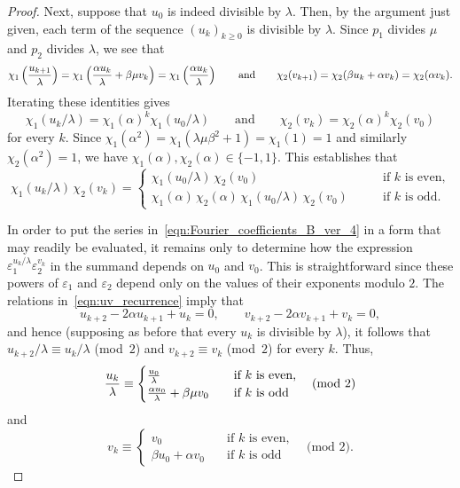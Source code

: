 \documentclass[11pt,reqno]{amsart}
\renewcommand{\=}{\;=\;}
\theoremstyle{myremark}
\begin{document}
\begin{proof}
Next, suppose that $u_0$ is indeed divisible by $\lambda$. 
Then, by the argument just given, each term of the sequence $(u_k)_{k \geq 0}$ is divisible by $\lambda$. Since $p_1$ divides $\mu$ and $p_2$ divides $\lambda$, we see that
\[ 
\chi_1\left(u_{k+1} \over \lambda\right) = \chi_1\left({\alpha u_k \over \lambda} + \beta\mu v_k \right) = \chi_1\left({\alpha u_k \over \lambda} \right) \qquad \text{and} \qquad \chi_2(v_{k+1}) = \chi_2(\beta u_k + \alpha v_k) = \chi_2(\alpha v_k). 
\]
Iterating these identities gives
\[
\chi_1(u_k/\lambda) = \chi_1(\alpha)^k \chi_1(u_0/\lambda) \qquad \text{and} \qquad \chi_2(v_k) = \chi_2(\alpha)^k \chi_2(v_0)
\]
for every $k$. Since $\chi_1(\alpha^2) = \chi_1(\lambda\mu\beta^2+1)=\chi_1(1)=1$ and similarly $\chi_2(\alpha^2)=1$, we have $\chi_1(\alpha), \chi_2(\alpha)\in\{-1,1\}$. 
This establishes that
\[ 
\chi_1(u_k/\lambda) \, \chi_2(v_k) = \begin{cases} \chi_1(u_0/\lambda)\,\chi_2(v_0) \qquad &\text{if $k$ is even,} \\ \chi_1(\alpha)\,\chi_2(\alpha) \,\chi_1(u_0/\lambda)\,\chi_2(v_0) \qquad &\text{if $k$ is odd.} \end{cases} 
\]

In order to put the series in~\eqref{eqn:Fourier_coefficients_B_ver_4} in a form that may readily be evaluated, it remains only to determine how the expression $\varepsilon_1^{u_k/\lambda} \varepsilon_2^{v_k}$ in the summand depends on $u_0$ and $v_0$. 
This is straightforward since these powers of $\varepsilon_1$ and $\varepsilon_2$ depend only on the values of their exponents modulo $2$. 
The relations in~\eqref{eqn:uv_recurrence} imply that
\[ u_{k+2} - 2\alpha u_{k+1} + u_k = 0, \qquad v_{k+2} - 2\alpha v_{k+1} + v_k = 0, \]
and hence (supposing as before that every $u_k$ is divisible by $\lambda$), it follows that $u_{k+2}/\lambda \equiv u_k/\lambda$ (mod~$2$) and $v_{k+2} \equiv v_k$ (mod~$2$) for every $k$. 
Thus,
\[ 
{u_k \over \lambda} \equiv \begin{cases} {u_0 \over \lambda} \quad &\text{if $k$ is even,} \\ {\alpha u_0 \over \lambda} + \beta \mu v_0 \quad &\text{if $k$ is odd} \end{cases} \quad \text{(mod $2$)} 
\]
and
\[ 
v_k \equiv \begin{cases} v_0\quad &\text{if $k$ is even,} \\ \beta u_0 + \alpha v_0 \quad &\text{if $k$ is odd} \end{cases} \quad \text{(mod $2$).} 
\]


\end{proof}
\end{document}
